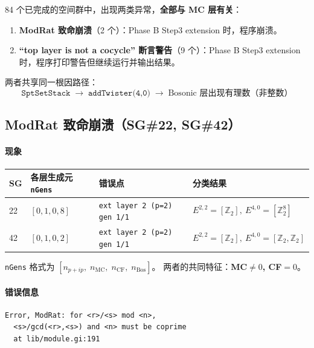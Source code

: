 \documentclass[a4paper,fontset=ubuntu,12pt]{ctexart}
\begin{document}
84 个已完成的空间群中，出现两类异常，\textbf{全部与 MC 层有关}：

\begin{enumerate}
\item \textbf{ModRat 致命崩溃}（2 个）：Phase B Step3 extension 时，程序崩溃。
\item \textbf{``top layer is not a cocycle'' 断言警告}（9 个）：Phase B Step3 extension 时，程序打印警告但继续运行并输出结果。
\end{enumerate}

两者共享同一根因路径：
\begin{equation}
\texttt{SptSetStack} \;\to\; \texttt{addTwister(4,0)} \;\to\; \text{Bosonic 层出现有理数（非整数）}
\label{eq:mc-bos-path}
\end{equation}

\subsection{ModRat 致命崩溃（SG\#22, SG\#42）}
\label{sec:modrat-bug}

\paragraph{现象}

\begin{center}
\begin{tabular}{llll}
\hline
SG & 各层生成元 \texttt{nGens} & 错误点 & 分类结果 \\
\hline
22 & $[0, 1, 0, 8]$ & \texttt{ext layer 2 (p=2) gen 1/1} & $E^{2,2}{=}[\mathbb{Z}_2],\ E^{4,0}{=}[\mathbb{Z}_2^8]$ \\
42 & $[0, 1, 0, 2]$ & \texttt{ext layer 2 (p=2) gen 1/1} & $E^{2,2}{=}[\mathbb{Z}_2],\ E^{4,0}{=}[\mathbb{Z}_2,\mathbb{Z}_2]$ \\
\hline
\end{tabular}
\end{center}

\texttt{nGens} 格式为 $[n_{p{+}ip},\; n_{\mathrm{MC}},\; n_{\mathrm{CF}},\; n_{\mathrm{Bos}}]$。
两者的共同特征：\textbf{MC$\neq 0$, CF$=0$}。

\paragraph{错误信息}

\begin{verbatim}
Error, ModRat: for <r>/<s> mod <n>,
  <s>/gcd(<r>,<s>) and <n> must be coprime
  at lib/module.gi:191
\end{verbatim}
\end{document}
